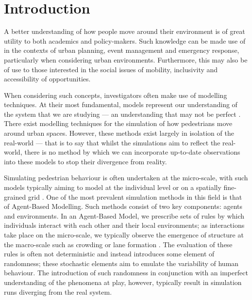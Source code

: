 \chapter{Introduction}\label{ch:intro}

A better understanding of how people move around their environment is of great
utility to both academics and policy-makers.
Such knowledge can be made use of in the contexts of urban planning, event
management and emergency response, particularly when considering urban
environments.
Furthermore, this may also be of use to those interested in the social issues of
mobility, inclusivity and accessibility of opportunities.

When considering such concepts, investigators often make use of modelling
techniques.
At their most fundamental, models represent our understanding of
the system that we are studying --- an understanding that may not be perfect
\citep{stanislaw1986tests}.
There exist modelling techniques for the simulation of how pedestrians move
around urban spaces.
However, these methods exist largely in isolation of the real-world --- that is
to say that whilst the simulations aim to reflect the real-world, there is no
method by which we can incorporate up-to-date observations into these models to
stop their divergence from reality.

Simulating pedestrian behaviour is often undertaken at the micro-scale, with
such models typically aiming to model at the individual level or on a spatially
fine-grained grid \citep{burstedde2001simulation}.
One of the most prevalent simulation methods in this field is that of
Agent-Based Modelling.
Such methods consist of two key components: agents and environments.
In an Agent-Based Model, we prescribe sets of rules by which individuals interact with each
other and their local environments; as interactions take place on the
micro-scale, we typically observe the emergence of structure at the macro-scale
such as crowding \citep{batty2003discrete} or lane formation \citep{liu2014agent}.
The evaluation of these rules is often not deterministic and instead
introduces some element of randomness; these stochastic elements aim to emulate
the variability of human behaviour.
The introduction of such randomness in conjunction with an imperfect
understanding of the phenomena at play, however, typically result in simulation
runs diverging from the real system.

